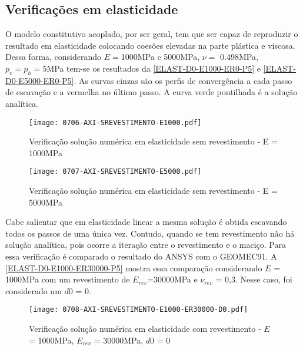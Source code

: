 \subsection{Verificações em elasticidade}

O modelo constitutivo acoplado, por ser geral, tem que ser capaz de reproduzir o resultado em elasticidade colocando coesões elevadas na parte plástica e viscosa. Dessa forma, considerando $E =$1000MPa e 5000MPa, $\nu =$ 0.498MPa, $p_v = p_h = 5$MPa tem-se os resultados da \autoref{ELAST-D0-E1000-ER0-P5} e \autoref{ELAST-D0-E5000-ER0-P5}. As curvas cinzas são os perfis de convergência a cada passo de escavação e a vermelha no último passo. A curva verde pontilhada é a solução analítica.

\begin{figure}[H]
	\begin{center}
		\texttt{[image: 0706-AXI-SREVESTIMENTO-E1000.pdf]}
	\end{center}
	\caption{\label{ELAST-D0-E1000-ER0-P5}Verificação solução numérica em elasticidade sem revestimento - E = 1000MPa}
\end{figure}

\begin{figure}[H]
	\begin{center}
		\texttt{[image: 0707-AXI-SREVESTIMENTO-E5000.pdf]}
	\end{center}
	\caption{\label{ELAST-D0-E5000-ER0-P5}Verificação solução numérica em elasticidade sem revestimento - E = 5000MPa}
\end{figure}

Cabe salientar que em elasticidade linear a mesma solução é obtida escavando todos os passos de uma única vez. Contudo, quando se tem revestimento não há solução analítica, pois ocorre a iteração entre o revestimento e o maciço. Para essa verificação é comparado o resultado do ANSYS com o GEOMEC91. A \autoref{ELAST-D0-E1000-ER30000-P5} mostra essa comparação considerando $E$ = 1000MPa com um revestimento de $E_{rev}$=30000MPa e $\nu_{rev}$ = 0,3. Nesse caso, foi considerado um $d0$ = 0.

\begin{figure}[H]
	\begin{center}
		\texttt{[image: 0708-AXI-SREVESTIMENTO-E1000-ER30000-D0.pdf]}
	\end{center}
	\caption{\label{ELAST-D0-E1000-ER30000-P5}Verificação solução numérica em elasticidade com revestimento - $E$ = 1000MPa, $E_{rev}$ = 30000MPa, $d0$ = 0}
\end{figure}


